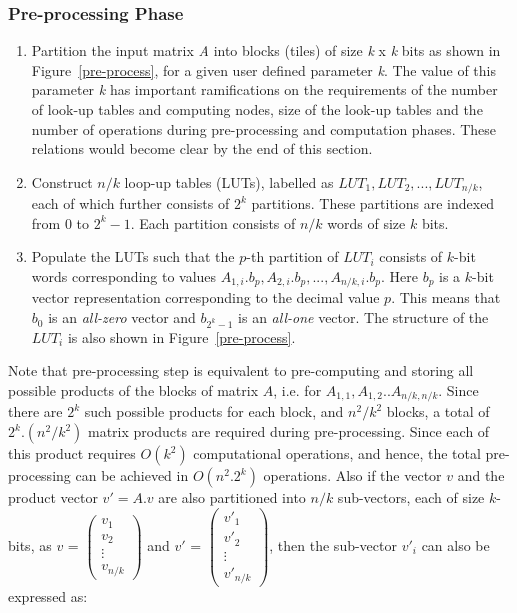 \documentclass[conference, 9pt]{IEEEtran}
\begin{document}
\subsubsection{Pre-processing Phase}
\begin{enumerate}

    \item Partition the input matrix \emph{A} into blocks (tiles) of size \emph{k} x \emph{k} bits
    as shown in Figure~\ref{pre-process}, for a given user defined parameter \emph{k}. The value of
this parameter \emph{k} has important ramifications on the requirements of the number of look-up
tables and computing nodes, size of the look-up tables and the number of operations during
pre-processing and computation phases. These relations would become clear by the end of this
section.  
  \item Construct $n/k$ loop-up tables (LUTs), labelled as $LUT_{1}, LUT_{2}, ..., LUT_{n/k}$, each
      of which further consists of $2^{k}$ partitions. These partitions are indexed from $0$ to
      $2^{k}-1$. Each partition consists of $n/k$ words of size $k$ bits.
  \item Populate the LUTs such that the $p$-th partition of $LUT_{i}$ consists of $k$-bit words
      corresponding to values $A_{1,i}.b_{p}, A_{2,i}.b_{p}, ... , A_{n/k,i}.b_{p}$. Here $b_{p}$ is
      a $k$-bit vector representation corresponding to the decimal value $p$. This means that $b_0$
      is an \emph{all-zero} vector and $b_{2^k-1}$ is an \emph{all-one} vector. The structure of the
      $LUT_i$ is also shown in Figure~\ref{pre-process}.
\end{enumerate}

Note that pre-processing step is equivalent to pre-computing and storing all possible products of
the blocks of matrix $A$, i.e. for $A_{1,1}, A_{1,2} .. A_{n/k,n/k}$. Since there are $2^{k}$ such
possible products for each block, and $n^{2}/k^{2}$ blocks, a total of $2^{k}.(n^{2}/k^{2})$ matrix
products are required during pre-processing. Since each of this product requires $O(k^{2})$
computational operations, and hence, the total pre-processing can be achieved in $O(n^{2}.2^{k})$
operations. Also if the vector $v$ and the product vector $v' = A.v$ are also partitioned into $n/k$
sub-vectors, each of size $k$-bits, as $v$ = $\begin{pmatrix} v_1 \\
    v_2 \\
    \vdots \\
    v_{n/k}
\end{pmatrix}$ and $v'$ = $\begin{pmatrix}
    v'_1 \\
    v'_2 \\
    \vdots \\
    v'_{n/k}
\end{pmatrix}$, then the sub-vector $v'_{i}$ can also be expressed as:
\end{document}
